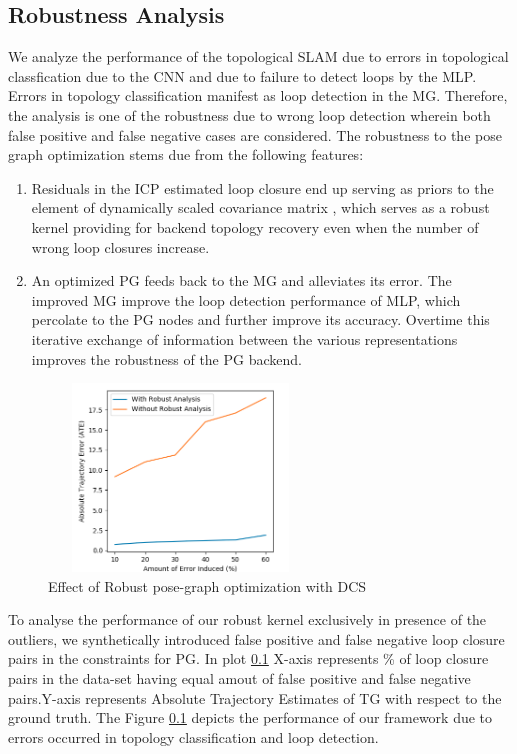 \documentclass[letterpaper, 10 pt, conference]{ieeeconf}  %
\begin{document}
	\subsection{Robustness Analysis}
	\label{sec:robust_analysis}
	
	We analyze the performance of the topological SLAM due to errors in topological classfication due to the CNN and due to failure to detect loops by the MLP. Errors in topology classification manifest as loop detection in the MG. Therefore, the analysis is one of the robustness due to wrong loop detection  wherein both false positive and false negative cases are considered. The robustness to the pose graph optimization stems due from the following features:
	
	\begin{enumerate}
		\item Residuals in the ICP estimated loop closure end up serving as priors to the element of dynamically scaled covariance matrix \cite{agarwal2013robust}, which serves as a robust kernel providing for backend topology recovery even when the number of wrong loop closures increase.
		\item An optimized PG feeds back to the MG and alleviates its error. The improved MG improve the loop detection performance of MLP, which percolate to the PG nodes and further improve its accuracy. Overtime this iterative exchange of information between the various representations improves the robustness of the PG backend.
	\end{enumerate}
	
	\begin{figure}[H]
		\centering
		\includegraphics[width=7cm,height=5cm]{pic/robust_analysis_v3.png}
		\caption{Effect of Robust pose-graph optimization with DCS}
		\label{fig:failure_analysis}
	\end{figure}
	To analyse the performance of our robust kernel exclusively in presence of the outliers, we synthetically introduced false positive and false negative loop closure pairs in the constraints for PG. In plot \ref{sec:robust_analysis} X-axis represents \% of loop closure pairs in the data-set having equal amout of false positive and false negative pairs.Y-axis represents Absolute Trajectory Estimates of TG with respect to the ground truth. The Figure \ref{sec:robust_analysis} depicts the performance of our framework due to errors occurred in topology classification and loop detection. 
	
\end{document}
